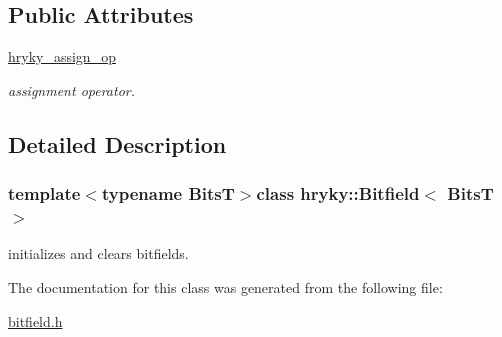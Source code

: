 \subsection*{Public Attributes}
\begin{DoxyCompactItemize}
\item 
\hypertarget{classhryky_1_1_bitfield_ab1958071d377ef278fc7e21efd923adf}{\hyperlink{classhryky_1_1_bitfield_ab1958071d377ef278fc7e21efd923adf}{hryky\-\_\-assign\-\_\-op}}\label{classhryky_1_1_bitfield_ab1958071d377ef278fc7e21efd923adf}

\begin{DoxyCompactList}\small\item\em assignment operator. \end{DoxyCompactList}\end{DoxyCompactItemize}


\subsection{Detailed Description}
\subsubsection*{template$<$typename Bits\-T$>$class hryky\-::\-Bitfield$<$ Bits\-T $>$}

initializes and clears bitfields. 

The documentation for this class was generated from the following file\-:\begin{DoxyCompactItemize}
\item 
\hyperlink{bitfield_8h}{bitfield.\-h}\end{DoxyCompactItemize}
